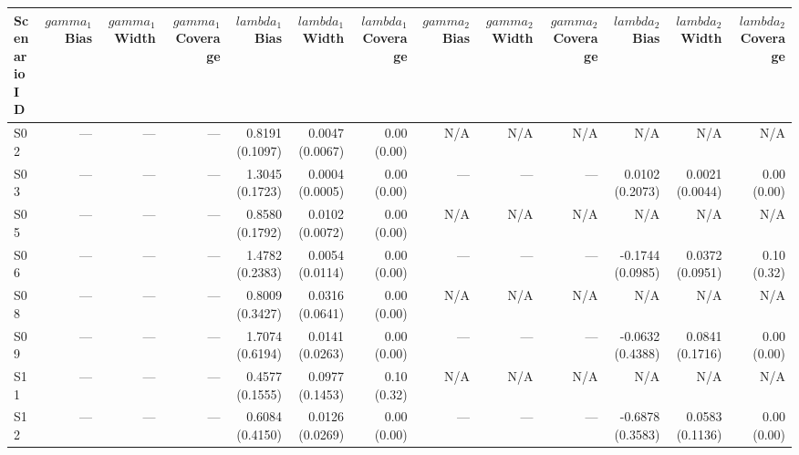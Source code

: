 \begin{tabular}{lrrrrrrrrrrrr}
\toprule
Scenario ID & $gamma_{1}$ Bias & $gamma_{1}$ Width & $gamma_{1}$ Coverage & $lambda_{1}$ Bias & $lambda_{1}$ Width & $lambda_{1}$ Coverage & $gamma_{2}$ Bias & $gamma_{2}$ Width & $gamma_{2}$ Coverage & $lambda_{2}$ Bias & $lambda_{2}$ Width & $lambda_{2}$ Coverage \\
\midrule
S02 & --- & --- & --- & 0.8191 (0.1097) & 0.0047 (0.0067) & 0.00 (0.00) & N/A & N/A & N/A & N/A & N/A & N/A \\
S03 & --- & --- & --- & 1.3045 (0.1723) & 0.0004 (0.0005) & 0.00 (0.00) & --- & --- & --- & 0.0102 (0.2073) & 0.0021 (0.0044) & 0.00 (0.00) \\
S05 & --- & --- & --- & 0.8580 (0.1792) & 0.0102 (0.0072) & 0.00 (0.00) & N/A & N/A & N/A & N/A & N/A & N/A \\
S06 & --- & --- & --- & 1.4782 (0.2383) & 0.0054 (0.0114) & 0.00 (0.00) & --- & --- & --- & -0.1744 (0.0985) & 0.0372 (0.0951) & 0.10 (0.32) \\
S08 & --- & --- & --- & 0.8009 (0.3427) & 0.0316 (0.0641) & 0.00 (0.00) & N/A & N/A & N/A & N/A & N/A & N/A \\
S09 & --- & --- & --- & 1.7074 (0.6194) & 0.0141 (0.0263) & 0.00 (0.00) & --- & --- & --- & -0.0632 (0.4388) & 0.0841 (0.1716) & 0.00 (0.00) \\
S11 & --- & --- & --- & 0.4577 (0.1555) & 0.0977 (0.1453) & 0.10 (0.32) & N/A & N/A & N/A & N/A & N/A & N/A \\
S12 & --- & --- & --- & 0.6084 (0.4150) & 0.0126 (0.0269) & 0.00 (0.00) & --- & --- & --- & -0.6878 (0.3583) & 0.0583 (0.1136) & 0.00 (0.00) \\
\bottomrule
\end{tabular}
